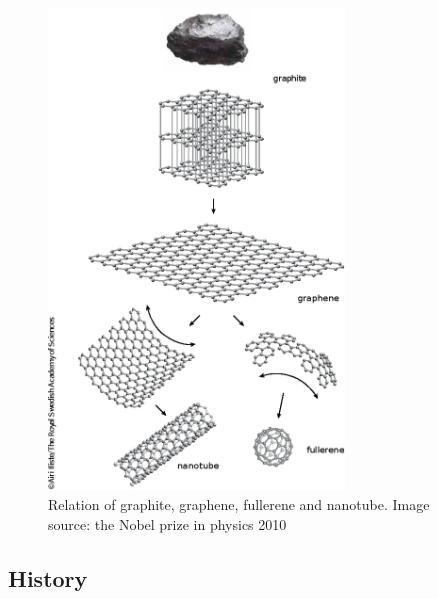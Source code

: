 \begin{figure}[htbp] 
\centering  
\includegraphics[width=0.7\textwidth]{gra_grap.eps}
\caption[Relation between graphite, graphene, fullerene and nanotube]{Relation of graphite, graphene, fullerene and nanotube. Image source: the Nobel prize in physics 2010 \cite{gra_grap}}  
\label{fig:gra_grap}
\end{figure} 


\subsection{History}

